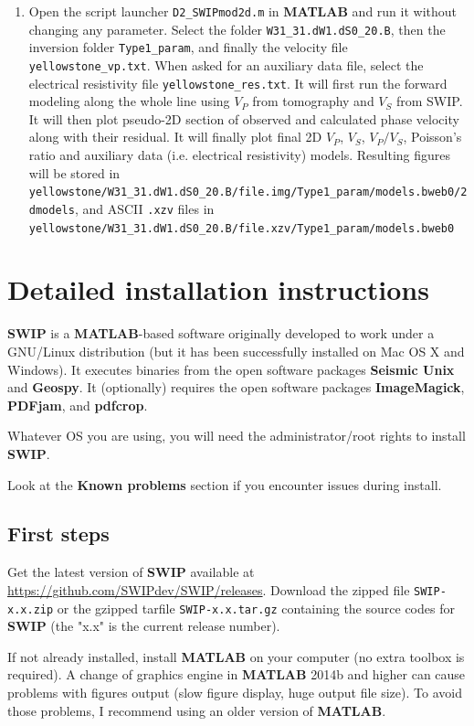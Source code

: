 \documentclass[twoside,a4paper]{article}
\def\SWIP{\textbf{SWIP}}
\def\SeismicUnix{\textbf{Seismic Unix}}
\def\Geopsy{\textbf{Geospy}}
\def\ImageMagick{\textbf{ImageMagick}}
\def\PDFjam{\textbf{PDFjam}}
\def\pdfcrop{\textbf{pdfcrop}}
\def\MATLAB{\textbf{MATLAB}}
\begin{document}
\begin{enumerate}[leftmargin=*]
\item Open the script launcher \verb|D2_SWIPmod2d.m| in {\MATLAB} and run it without changing any parameter. Select the folder \verb|W31_31.dW1.dS0_20.B|, then the inversion folder \verb|Type1_param|, and finally the velocity file \verb|yellowstone_vp.txt|. When asked for an auxiliary data file, select the electrical resistivity file \verb|yellowstone_res.txt|. It will first run the forward modeling along the whole line using $V_P$ from tomography and $V_S$ from SWIP. It will then plot pseudo-2D section of observed and calculated phase velocity along with their residual. It will finally plot final 2D $V_P$, $V_S$, $V_P/V_S$, Poisson's ratio and auxiliary data (i.e. electrical resistivity) models. Resulting figures will be stored in \verb|yellowstone/W31_31.dW1.dS0_20.B/file.img/Type1_param/models.bweb0/2dmodels|, and ASCII \verb|.xzv| files in \verb|yellowstone/W31_31.dW1.dS0_20.B/file.xzv/Type1_param/models.bweb0|

\end{enumerate}

\newpage
\section{Detailed installation instructions}
\label{sec:detailedinstruc}
{\SWIP} is a \MATLAB-based software originally developed to work under a GNU/Linux distribution (but it has been successfully installed on Mac OS X and Windows). It executes binaries from the open software packages {\SeismicUnix} and {\Geopsy}. It (optionally) requires the open software packages {\ImageMagick}, {\PDFjam}, and {\pdfcrop}.

Whatever OS you are using, you will need the administrator/root rights to install {\SWIP}.

Look at the \textbf{Known problems} section if you encounter issues during install.

\subsection{First steps}
Get the latest version of {\SWIP} available at \url{https://github.com/SWIPdev/SWIP/releases}. Download the zipped file \verb|SWIP-x.x.zip| or the gzipped tarfile \verb|SWIP-x.x.tar.gz| containing the source codes for {\SWIP} (the "x.x" is the current release number).

If not already installed, install {\MATLAB} on your computer (no extra toolbox is required). A change of graphics engine in {\MATLAB} 2014b and higher can cause problems with figures output (slow figure display, huge output file size). To avoid those problems, I recommend using an older version of {\MATLAB}.
\end{document}
